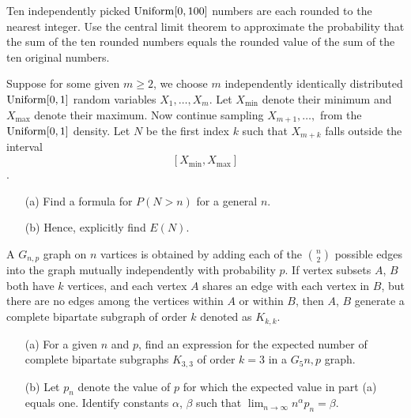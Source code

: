 \begin{problem}
  Ten independently picked \(\operatorname{Uniform}[0,100]\) numbers are each rounded to
  the nearest integer. Use the central limit theorem to approximate the
  probability that the sum of the ten rounded numbers equals the rounded
  value of the sum of the ten original numbers.
\end{problem}
\begin{solution}
\end{solution}

\begin{problem}
  Suppose for some given \(m\geq 2\), we choose \(m\) independently
  identically distributed \(\operatorname{Uniform}[0,1]\) random variables
  \(X_1,\dotsc,X_m\). Let \(X_{\text{min}}\) denote their minimum and
  \(X_{\text{max}}\) denote their maximum. Now continue sampling
  \(X_{m+1},\dotsc,\) from the \(\operatorname{Uniform}[0,1]\) density. Let \(N\) be the
  first index \(k\) such that \(X_{m+k}\) falls outside the
  interval \[[X_{\text{min}},X_{\text{max}}]\].
  \begin{itemize}[noitemsep]
  \item[(a)] Find a formula for \(P(N>n)\) for a general \(n\).
  \item[(b)] Hence, explicitly find \(E(N)\).
  \end{itemize}
\end{problem}
\begin{solution}
\end{solution}

\begin{problem}
  A \(G_{n,p}\) graph on \(n\) vartices is obtained by adding each of the
  \(\binom{n}{2}\) possible edges into the graph mutually independently
  with probability \(p\). If vertex subsets \(A\), \(B\) both have \(k\)
  vertices, and each vertex \(A\) shares an edge with each vertex in \(B\),
  but there are no edges among the vertices within \(A\) or within \(B\),
  then \(A\), \(B\) generate a complete bipartate subgraph of order \(k\)
  denoted as \(K_{k,k}\).
  \begin{itemize}[noitemsep]
  \item[(a)] For a given \(n\) and \(p\), find an expression for the
    expected number of complete bipartate subgraphs \(K_{3,3}\) of order
    \(k=3\) in a \(G_5n,p\) graph.
  \item[(b)] Let \(p_n\) denote the value of \(p\) for which the expected
    value in part (a) equals one. Identify constants \(\alpha\), \(\beta\)
    such that \(\lim_{n\to\infty}n^\alpha p_n=\beta\).
  \end{itemize}
\end{problem}
\begin{solution}
\end{solution}

